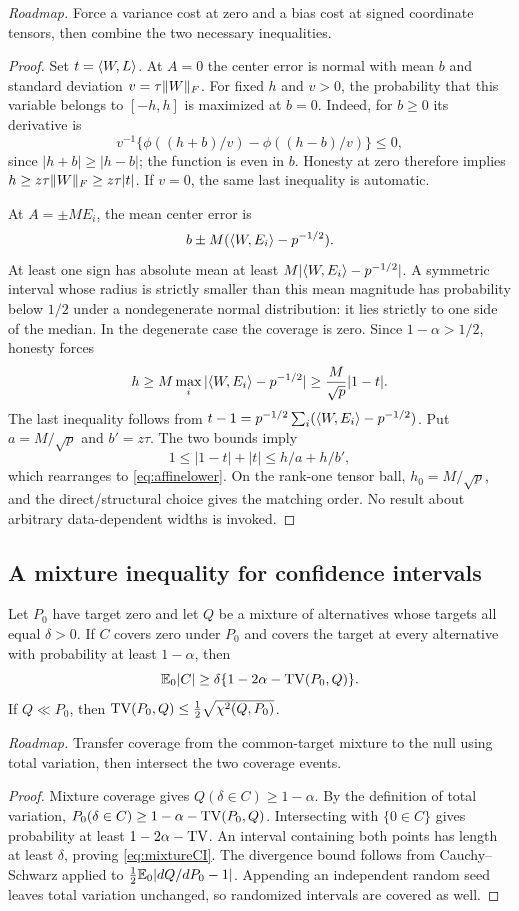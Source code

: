 \noindent\emph{Roadmap.} Force a variance cost at zero and a bias cost at signed coordinate tensors, then combine the two necessary inequalities.
\begin{proof}
Set $t=\langle W,L\rangle$. At $A=0$ the center error is normal with mean $b$ and standard deviation $v=\tau\lVert W\rVert_F$. For fixed $h$ and $v>0$, the probability that this variable belongs to $[-h,h]$ is maximized at $b=0$. Indeed, for $b\ge0$ its derivative is
\[
 v^{-1}\{\phi((h+b)/v)-\phi((h-b)/v)\}\le0,
\]
since $|h+b|\ge|h-b|$; the function is even in $b$. Honesty at zero therefore implies $h\ge z\tau\lVert W\rVert_F\ge z\tau|t|$. If $v=0$, the same last inequality is automatic.

At $A=\pm M E_i$, the mean center error is
\[
 b\pm M(\langle W,E_i\rangle-p^{-1/2}).
\]
At least one sign has absolute mean at least $M|\langle W,E_i\rangle-p^{-1/2}|$. A symmetric interval whose radius is strictly smaller than this mean magnitude has probability below $1/2$ under a nondegenerate normal distribution: it lies strictly to one side of the median. In the degenerate case the coverage is zero. Since $1-\alpha>1/2$, honesty forces
\[
 h\ge M\max_i|\langle W,E_i\rangle-p^{-1/2}|
 \ge\frac M{\sqrt p}|1-t|.
\]
The last inequality follows from $t-1=p^{-1/2}\sum_i(\langle W,E_i\rangle-p^{-1/2})$. Put $a=M/\sqrt p$ and $b'=z\tau$. The two bounds imply
\[
 1\le|1-t|+|t|\le h/a+h/b',
\]
which rearranges to \eqref{eq:affinelower}. On the rank-one tensor ball, $h_0=M/\sqrt p$, and the direct/structural choice gives the matching order. No result about arbitrary data-dependent widths is invoked.
\end{proof}

\subsection{A mixture inequality for confidence intervals}

\begin{lemma}\label{lem:mixture}
Let $P_0$ have target zero and let $Q$ be a mixture of alternatives whose targets all equal $\delta>0$. If $C$ covers zero under $P_0$ and covers the target at every alternative with probability at least $1-\alpha$, then
\begin{equation}\label{eq:mixtureCI}
 \mathbb E_0|C|\ge\delta\{1-2\alpha-\operatorname{TV}(P_0,Q)\}.
\end{equation}
If $Q\ll P_0$, then $\operatorname{TV}(P_0,Q)\le\frac12\sqrt{\chi^2(Q,P_0)}$.
\end{lemma}


\noindent\emph{Roadmap.} Transfer coverage from the common-target mixture to the null using total variation, then intersect the two coverage events.
\begin{proof}
Mixture coverage gives $Q(\delta\in C)\ge1-\alpha$. By the definition of total variation, $P_0(\delta\in C)\ge1-\alpha-\operatorname{TV}(P_0,Q)$. Intersecting with $\{0\in C\}$ gives probability at least $1-2\alpha-\operatorname{TV}$. An interval containing both points has length at least $\delta$, proving \eqref{eq:mixtureCI}. The divergence bound follows from Cauchy--Schwarz applied to $\frac12\mathbb E_0|dQ/dP_0-1|$. Appending an independent random seed leaves total variation unchanged, so randomized intervals are covered as well.
\end{proof}

